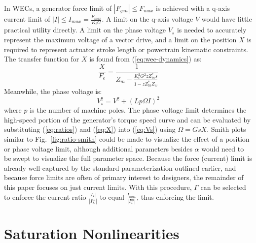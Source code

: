 \documentclass{ifacconf}
\begin{document}
In WECs, a generator force limit of $|F_{gen}| \leq F_{max}$ is achieved with a q-axis current limit of $|I| \leq I_{max} = \frac{F_{max}}{K_t G}$. A limit on the q-axis voltage $V$ would have little practical utility directly. A limit on the phase voltage $V_s$ is needed to accurately represent the maximum voltage of a vector drive, and a limit on the position $X$ is required to represent actuator stroke length or powertrain kinematic constraints. The transfer function for $X$ is found from (\ref{eq:wec-dynamics}) as:
\begin{equation}\label{eq:X}
    \frac{X}{F_e} = \frac{1}{Z_m - \frac{K_t^2 G^2 z Z_{th}^* s}{1 - z Z_{th}^* Z_w}}
\end{equation}
Meanwhile, the phase voltage is: 
\begin{equation}\label{eq:Vs}
    V_s^2 = V^2 + (L p \Omega I)^2
\end{equation}
where $p$ is the number of machine poles. The phase voltage limit determines the high-speed portion of the generator's torque speed curve and can be evaluated by substituting (\ref{eq:ratios}) and (\ref{eq:X}) into (\ref{eq:Vs})  using $\Omega=GsX$. Smith plots similar to Fig.~\ref{fig:ratio-smith} could be made to visualize the effect of a position or phase voltage limit, although additional parameters besides $\alpha$ would need to be swept to visualize the full parameter space. Because the force (current) limit is already well-captured by the standard parameterization outlined earlier, and because force limits are often of primary interest to designers, the remainder of this paper focuses on just current limits. With this procedure, $\Gamma$ can be selected to enforce the current ratio $\frac{|I_L|}{|I_L^m|}$ to equal $\frac{I_{max}}{|I_L^m|}$, thus enforcing the limit.


\section{Saturation Nonlinearities}\label{sec:nonlinear}
\end{document}
